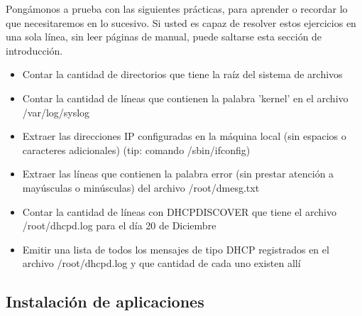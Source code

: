 \begin{frame}

    Pongámonos a prueba con las siguientes prácticas, para aprender o recordar
    lo que necesitaremos en lo sucesivo. Si usted es capaz de resolver estos
    ejercicios en una sola línea, sin leer páginas de manual, puede
    saltarse esta sección de introducción. \\[0.2cm]

    \begin{itemize}
        \item Contar la cantidad de directorios que tiene la raíz del sistema
        de archivos
        \item Contar la cantidad de líneas que contienen la palabra 'kernel' en
        el archivo /var/log/syslog
        \item Extraer las direcciones IP configuradas en la máquina local (sin
        espacios o caracteres adicionales) (tip: comando /sbin/ifconfig)
        \item Extraer las líneas que contienen la palabra error (sin prestar
        atención a mayúsculas o minúsculas) del archivo /root/dmesg.txt
        \item Contar la cantidad de líneas con DHCPDISCOVER que tiene el
        archivo /root/dhcpd.log para el día 20 de Diciembre
        \item Emitir una lista de todos los mensajes de tipo DHCP registrados
        en el archivo /root/dhcpd.log y que cantidad de cada uno existen allí
    \end{itemize}
    
\end{frame}

\subsection{Instalación de aplicaciones} %

